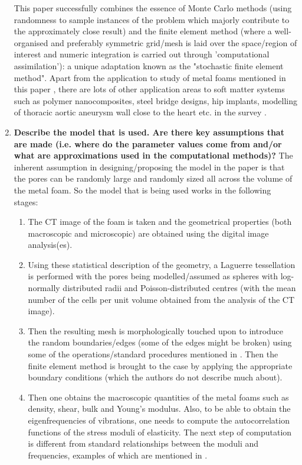 \documentclass{article}
\begin{document}
\begin{enumerate}
	This paper successfully combines the essence of Monte Carlo methods (using randomness to sample instances of the problem which majorly contribute to the approximately close result) and the finite element method (where a well-organised and preferably symmetric grid/mesh is laid over the space/region of interest and numeric integration is carried out through 'computational assimilation'): a unique adaptation known as the "stochastic finite element method". Apart from the application to study of metal foams mentioned in this paper \cite{originalpaper}, there are lots of other application areas to soft matter systems such as polymer nanocomposites, steel bridge designs, hip implants, modelling of thoracic aortic aneurysm wall close to the heart etc. in the survey \cite{surveypaper}.
	\item \textbf{Describe the model that is used. Are there key assumptions that are made (i.e. where do the parameter values come from and/or what are approximations used in the computational
methods)?}
	The inherent assumption in designing/proposing the model in the paper is that the pores can be randomly large and randomly sized all across the volume of the metal foam. So the model that is being used works in the following stages:
	\begin{enumerate}
		\item The CT image of the foam is taken and the geometrical properties (both macroscopic and microscopic) are obtained using the digital image analysis(es).
		\item Using these statistical description of the geometry, a Laguerre tessellation is performed with the pores being modelled/assumed as spheres with log-normally distributed radii and Poisson-distributed centres (with the mean number of the cells per unit volume obtained from the analysis of the CT image).
		\item Then the resulting mesh is morphologically touched upon to introduce the random boundaries/edges (some of the edges might be broken) using some of the operations/standard procedures mentioned in \cite{morphology1, morphology2, morphology3, morphology4, morphology5}. Then the finite element method is brought to the case by applying the appropriate boundary conditions (which the authors do not describe much about).
		\item Then one obtains the macroscopic quantities of the metal foams such as density, shear, bulk and Young's modulus. Also, to be able to obtain the eigenfrequencies of vibrations, one needs to compute the autocorrelation functions of the stress moduli of elasticity. The next step of computation is different from standard relationships between the moduli and frequencies, examples of which are mentioned in \cite{freqMod1, freqMod2, freqMod3}.

\end{enumerate}
\end{enumerate}
\end{document}
